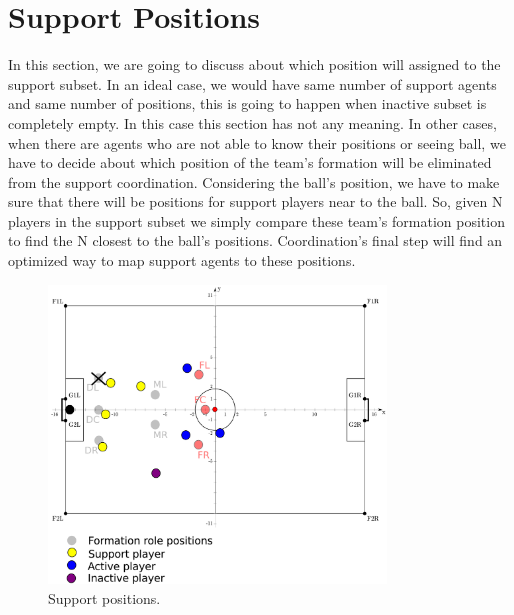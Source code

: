 \section{Support Positions}
In this section, we are going to discuss about which position will assigned to the support subset. In an ideal case, we would have same number of support agents and same number of positions, this is going to happen when inactive subset is completely empty. In this case this section has not any meaning. In other cases, when there are agents who are not able to know their positions or seeing ball, we have to decide about which position of the team's formation will be eliminated from the support coordination. Considering the ball's position, we have to make sure that there will be positions for support players near to the ball. So, given N players in the support subset we simply compare these team's formation position to find the N closest to the ball's positions. Coordination's final step will find an optimized way to map support agents to these positions.
\begin{figure}[htb!]
\centering
  \includegraphics[width=0.8\textwidth]{Chapter4/figures/SupportPos.pdf}
  \caption{Support positions.} 
  \label{fig:SupportPos}
\end{figure}

